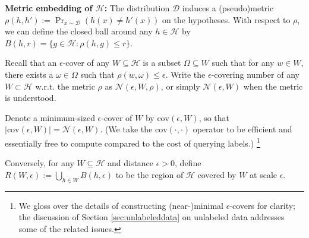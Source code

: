 \documentclass{article}[12pt]
\newcommand{\authcmt}[2]{\ifnum\Comments=1\textcolor{#1}{#2}\fi}
\newcommand{\akshay}[1]{\authcmt{red}      {[AB: #1]}}
\theoremstyle{named}
\newcommand{\vr}{\mathbf{r}}
\DeclareMathOperator{\Prtxt}{Pr}
\newcommand{\abs}[1]{\left| #1 \right|}
\newcommand{\prp}[2]{\Prtxt_{#2} \left(#1\right)}
\newcommand{\cov}[1]{\mbox{cov}\left(#1\right)}
\newcommand{\cH}{\mathcal{H}}
\newcommand{\cD}{\mathcal{D}}
\newcommand{\cN}{\mathcal{N}}
\begin{document}
{\bf Metric embedding of $\cH$:}
The distribution $\cD$ induces a (pseudo)metric $\rho(h, h') := \prp{h(x) \neq h'(x)}{x \sim \cD}$ on the hypotheses.
With respect to $\rho$, we can define the closed ball around any $h \in \cH$ by $B(h, r) = \{ g \in \cH : \rho(h, g) \leq r \}$. 

Recall that an $\epsilon$-cover of any $W \subseteq \cH$ is a subset $\Omega \subseteq W$ 
such that for any $w \in W$, 
there exists a $\omega \in \Omega$ such that $\rho(w, \omega) \leq \epsilon$. 
Write the $\epsilon$-covering number of any $W \subset \cH$ w.r.t. the metric $\rho$ 
as $\cN (\epsilon, W, \rho)$, or simply $\cN (\epsilon, W)$ when the metric is understood.

Denote a minimum-sized $\epsilon$-cover of $W$ by $\cov{\epsilon, W}$, so that $\abs{\cov{\epsilon, W}} = \cN(\epsilon, W)$. 
(We take the $\cov{\cdot, \cdot}$ operator to be efficient and essentially free to compute compared to the cost of querying labels.)
\footnote{We gloss over the details of constructing (near-)minimal $\epsilon$-covers for clarity; 
the discussion of Section \ref{sec:unlabeleddata} on unlabeled data addresses some of the related issues.}

Conversely, for any $W \subseteq \cH$ and distance $\epsilon > 0$, 
define $R (W, \epsilon) := \bigcup_{h \in W} B(h, \epsilon)$ to be the region of $\cH$ covered by $W$ at scale $\epsilon$. 

%
%
\end{document}

